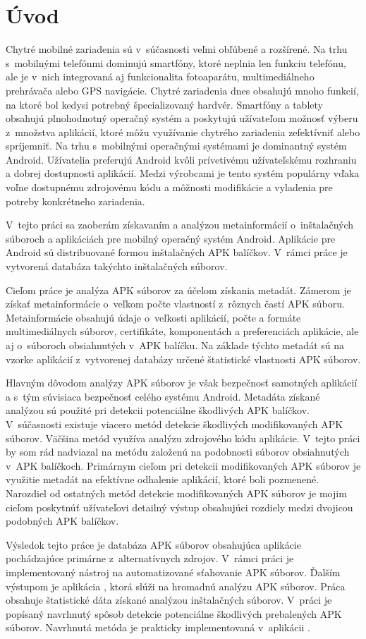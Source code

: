 \chapter{Úvod}
Chytré mobilné zariadenia sú v~súčasnosti veľmi obľúbené a rozšírené. Na trhu s~mobilnými telefónmi dominujú smartfóny, ktoré neplnia len funkciu telefónu, ale je v~nich integrovaná aj funkcionalita fotoaparátu, multimediálneho prehrávača alebo GPS navigácie. Chytré zariadenia dnes obsahujú mnoho funkcií, na ktoré bol kedysi potrebný špecializovaný hardvér. Smartfóny a tablety obsahujú plnohodnotný operačný systém a poskytujú užívateľom možnosť výberu z~množstva aplikácií, ktoré môžu využívanie chytrého zariadenia zefektívniť alebo spríjemniť. Na trhu s~mobilnými operačnými systémami je dominantný systém Android. Užívatelia preferujú Android kvôli prívetivému užívateľskému rozhraniu a dobrej dostupnosti aplikácií. Medzi výrobcami je tento systém populárny vďaka voľne dostupnému zdrojovému kódu a môžnosti modifikácie a vyladenia pre potreby konkrétneho zariadenia.

V~tejto práci sa zaoberám získavaním a analýzou metainformácií o~inštalačných súboroch a aplikáciách pre mobilný operačný systém Android. Aplikácie pre Android sú distribuované formou inštalačných APK balíčkov. V~rámci práce je vytvorená databáza takýchto inštalačných súborov. 

Cieľom práce je analýza APK súborov za účelom získania metadát. Zámerom je získať metainformácie o~veľkom počte vlastností z~rôznych častí APK súboru. Metainformácie obsahujú údaje o~veľkosti aplikácií, počte a formáte multimediálnych súborov, certifikáte, komponentách a preferenciách aplikácie, ale aj o~súboroch obsiahnutých v~APK balíčku. Na základe týchto metadát sú na vzorke aplikácií z~vytvorenej databázy určené štatistické vlastnosti APK súborov. 

Hlavným dôvodom analýzy APK súborov je však bezpečnosť samotných aplikácií a s~tým súvisiaca bezpečnosť celého systému Android. Metadáta získané analýzou sú použité pri detekcii potenciálne škodlivých APK balíčkov.
V~súčasnosti existuje viacero metód detekcie škodlivých modifikovaných APK  súborov. Väčšina metód využíva analýzu zdrojového kódu aplikácie. V~tejto práci by som rád nadviazal na metódu založenú na podobnosti súborov obsiahnutých v~APK balíčkoch.
Primárnym cieľom pri detekcii modifikovaných APK súborov je využitie metadát na efektívne odhalenie aplikácií, ktoré boli pozmenené. Narozdiel od ostatných metód detekcie modifikovaných APK súborov je mojim cieľom poskytnúť užívateľovi detailný výstup obsahujúci rozdiely medzi dvojicou podobných APK balíčkov.

Výsledok tejto práce je databáza APK súborov obsahujúca aplikácie pochádzajúce primárne z~alternatívnych zdrojov. V~rámci práci je implementovaný nástroj na automatizované sťahovanie APK súborov. Ďalším výstupom je aplikácia , ktorá slúži na hromadnú analýzu APK súborov. Práca obsahuje štatistické dáta získané analýzou inštalačných súborov. V~práci je popísaný navrhnutý spôsob detekcie potenciálne škodlivých prebalených APK súborov. Navrhnutá metóda je prakticky implementovaná v~aplikácii .